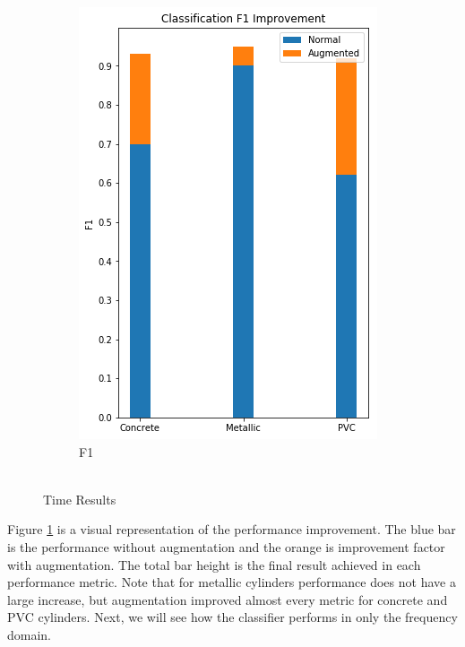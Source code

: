 \begin{figure}[H]
\begin{subfigure}[b]{0.4\linewidth}
    \includegraphics[width=\linewidth]{figures/Time-F1.png}
    \caption{F1}
  \end{subfigure}
  \caption{\\Time Results}
  \label{fig:time-results}
\end{figure}

\hspace{0.5in}Figure \ref{fig:time-results} is a visual representation of the performance improvement. The blue bar is the performance without augmentation and the orange is improvement factor with augmentation. The total bar height is the final result achieved in each performance metric. Note that for metallic cylinders performance does not have a large increase, but augmentation improved almost every metric for concrete and PVC cylinders. Next, we will see how the classifier performs in only the frequency domain.


